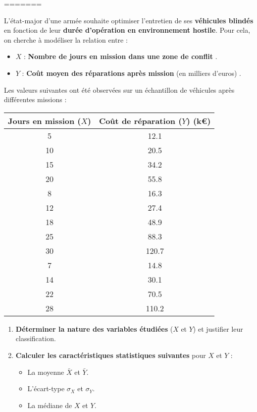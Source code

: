 {{\begin{enumerate}
\begin{enumerate}
 

\end{enumerate}
\end{enumerate}
=======



L'état-major d’une armée souhaite optimiser l’entretien de ses \textbf{véhicules blindés} en fonction de leur \textbf{durée d’opération en environnement hostile}. Pour cela, on cherche à modéliser la relation entre :

\begin{itemize}
    \item \( X \) : \textbf{Nombre de jours en mission dans une zone de conflit} .
    \item \( Y \) : \textbf{Coût moyen des réparations après mission} (en milliers d’euros) .
\end{itemize}

Les valeurs suivantes ont été observées sur un échantillon de véhicules après différentes missions :

\begin{center}
    \begin{tabular}{c c}
        \toprule
        \textbf{Jours en mission (\( X \))} & \textbf{Coût de réparation (\( Y \)) (k€)} \\
        \midrule
        5  & 12.1 \\
        10 & 20.5 \\
        15 & 34.2 \\
        20 & 55.8 \\
        8  & 16.3 \\
        12 & 27.4 \\
        18 & 48.9 \\
        25 & 88.3 \\
        30 & 120.7 \\
        7  & 14.8 \\
        14 & 30.1 \\
        22 & 70.5 \\
        28 & 110.2 \\
        \bottomrule
    \end{tabular}
\end{center}

\begin{enumerate}
    \item \textbf{Déterminer la nature des variables étudiées} (\( X \) et \( Y \)) et justifier leur classification.
    \item \textbf{Calculer les caractéristiques statistiques suivantes} pour \( X \) et \( Y \) :
    \begin{itemize}
        \item La moyenne \( \bar{X} \) et \( \bar{Y} \).
        \item L’écart-type \( \sigma_X \) et \( \sigma_Y \).
        \item La médiane de \( X \) et \( Y \).
    \end{itemize}
\end{enumerate}

}}
